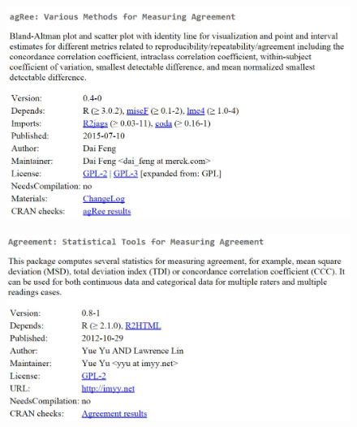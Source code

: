 \documentclass[compress]{beamer}        %
\begin{document}
\begin{frame}
	\begin{figure}
\centering
\includegraphics[width=1.05\linewidth]{images/CRAN-agRee}

\end{figure}

\end{frame}
\begin{frame}

	\begin{figure}
\centering
\includegraphics[width=1.05\linewidth]{images/CRAN-agreement}

\end{figure}

\end{frame}	
		
\end{document}
